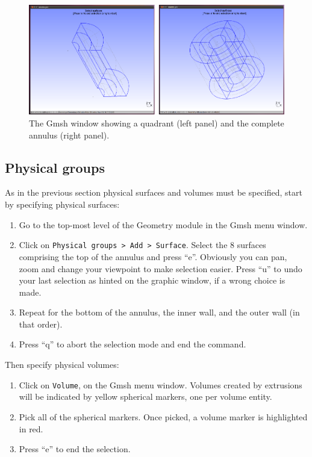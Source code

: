 \begin{figure}[htbp]
 \centering
  \includegraphics[width=1\textwidth]{../figures/completing_the_annulus.png}
  \caption{The Gmsh window showing a quadrant (left panel) and the complete annulus (right panel).}
  \label{fig:completing_the_annulus}
\end{figure}

\subsection{Physical groups}
\label{ssect:3d_physical_groups}
\par
As in the previous section physical surfaces and volumes must be specified, start by specifying physical
surfaces:
\begin{enumerate}
  \item Go to the top-most level of the Geometry module in the Gmsh menu window.
  \item Click on \lstinline+Physical groups > Add > Surface+. Select the $8$ surfaces comprising the
        top of the annulus and press ``e''. Obviously you can pan, zoom and change your viewpoint
        to make selection easier. Press ``u'' to undo your last selection as hinted on the graphic
        window, if a wrong choice is made.
  \item Repeat for the bottom of the annulus, the inner wall, and the outer wall (in that order).
  \item Press ``q'' to abort the selection mode and end the command.
\end{enumerate}
Then specify physical volumes:
\begin{enumerate}
  \item Click on \lstinline+Volume+, on the Gmsh menu window. Volumes created by extrusions will
           be indicated by yellow spherical markers, one per volume entity.
  \item Pick all of the spherical markers. Once picked, a volume marker is highlighted in red.
  \item Press ``e'' to end the selection.
\end{enumerate}

